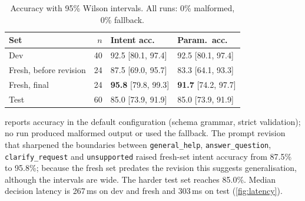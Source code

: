 \documentclass[10pt,twocolumn,letterpaper]{article}
\theoremstyle{definition}
\begin{document}
\begin{table}[t]
\centering\small
\caption{Accuracy with 95\% Wilson intervals. All runs: 0\% malformed, 0\% fallback.}
\label{tab:accuracy}
\setlength{\tabcolsep}{3pt}
\begin{tabular}{@{}lrll@{}}
\toprule
Set & $n$ & Intent acc. & Param.\ acc. \\
\midrule
Dev & 40 & 92.5 [80.1, 97.4] & 92.5 [80.1, 97.4] \\
Fresh, before revision & 24 & 87.5 [69.0, 95.7] & 83.3 [64.1, 93.3] \\
Fresh, final & 24 & \textbf{95.8} [79.8, 99.3] & \textbf{91.7} [74.2, 97.7] \\
Test & 60 & 85.0 [73.9, 91.9] & 85.0 [73.9, 91.9] \\
\bottomrule
\end{tabular}
\end{table}

 reports accuracy in the default configuration (schema grammar, strict
validation); no run produced malformed output or used the fallback. The prompt revision that
sharpened the boundaries between \texttt{general\_help}, \texttt{answer\_question},
\texttt{clarify\_request} and \texttt{unsupported} raised fresh-set intent accuracy from 87.5\% to
95.8\%; because the fresh set predates the revision this suggests generalisation, although the
intervals are wide. The harder test set reaches 85.0\%. Median decision latency is 267\,ms on dev
and fresh and 303\,ms on test (\cref{fig:latency}).
\end{document}
